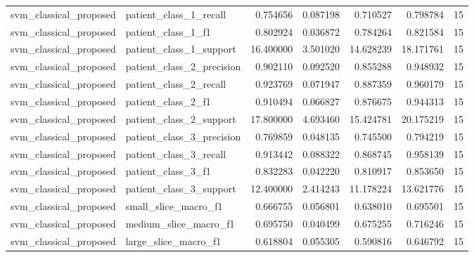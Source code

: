 \begin{tabular}{llrrrrr}
svm_classical_proposed & patient_class_1_recall & 0.754656 & 0.087198 & 0.710527 & 0.798784 & 15 \\
svm_classical_proposed & patient_class_1_f1 & 0.802924 & 0.036872 & 0.784264 & 0.821584 & 15 \\
svm_classical_proposed & patient_class_1_support & 16.400000 & 3.501020 & 14.628239 & 18.171761 & 15 \\
svm_classical_proposed & patient_class_2_precision & 0.902110 & 0.092520 & 0.855288 & 0.948932 & 15 \\
svm_classical_proposed & patient_class_2_recall & 0.923769 & 0.071947 & 0.887359 & 0.960179 & 15 \\
svm_classical_proposed & patient_class_2_f1 & 0.910494 & 0.066827 & 0.876675 & 0.944313 & 15 \\
svm_classical_proposed & patient_class_2_support & 17.800000 & 4.693460 & 15.424781 & 20.175219 & 15 \\
svm_classical_proposed & patient_class_3_precision & 0.769859 & 0.048135 & 0.745500 & 0.794219 & 15 \\
svm_classical_proposed & patient_class_3_recall & 0.913442 & 0.088322 & 0.868745 & 0.958139 & 15 \\
svm_classical_proposed & patient_class_3_f1 & 0.832283 & 0.042220 & 0.810917 & 0.853650 & 15 \\
svm_classical_proposed & patient_class_3_support & 12.400000 & 2.414243 & 11.178224 & 13.621776 & 15 \\
svm_classical_proposed & small_slice_macro_f1 & 0.666755 & 0.056801 & 0.638010 & 0.695501 & 15 \\
svm_classical_proposed & medium_slice_macro_f1 & 0.695750 & 0.040499 & 0.675255 & 0.716246 & 15 \\
svm_classical_proposed & large_slice_macro_f1 & 0.618804 & 0.055305 & 0.590816 & 0.646792 & 15 \\
\bottomrule
\end{tabular}
